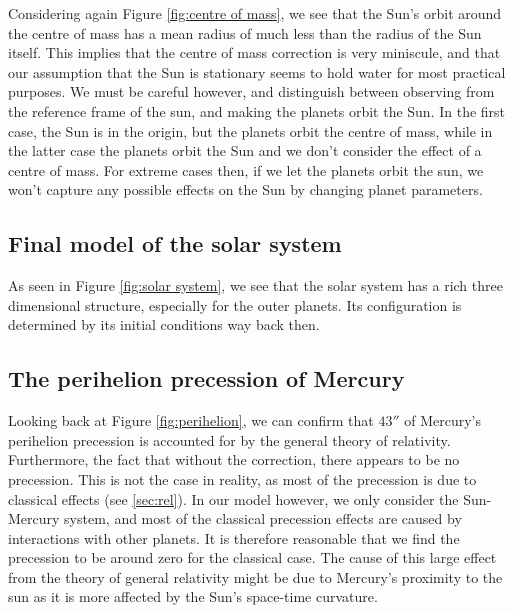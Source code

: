 Considering again Figure \ref{fig:centre of mass}, we see that the Sun's orbit around
the centre of mass has a mean radius of much less than the radius of the Sun itself.
This implies that the centre of mass correction is very miniscule, and that our assumption
that the Sun is stationary seems to hold water for most practical purposes. We must be careful however, and distinguish between observing from the reference frame of the sun, and making the planets orbit the Sun. In the first case, the Sun is in the origin, but the planets orbit the centre of mass, while in the latter case the planets orbit the Sun and we don't consider the effect of a centre of mass. For extreme cases then, if we let the planets orbit the sun, we won't capture any possible effects on the Sun by changing planet parameters.

\subsection{Final model of the solar system}
As seen in Figure \ref{fig:solar system}, we see that the solar system has a rich
three dimensional structure, especially for the outer planets. Its configuration is determined by its
initial conditions way back then.


\subsection{The perihelion precession of Mercury}
Looking back at Figure \ref{fig:perihelion}, we can confirm that $43''$ of Mercury's perihelion
precession is accounted for by the general theory of relativity. Furthermore, the fact that without the correction, there
appears to be no precession. This is not the case in reality, as most of the precession is due to classical effects (see \ref{sec:rel}). In our model however, we only consider the Sun-Mercury system, and most of the classical precession effects are caused by interactions with other planets. It is therefore reasonable that we find the precession to be around zero for the classical case. The cause of this large effect from the theory of general relativity might be due to Mercury's proximity to the sun as it is more affected by the Sun's space-time curvature.
